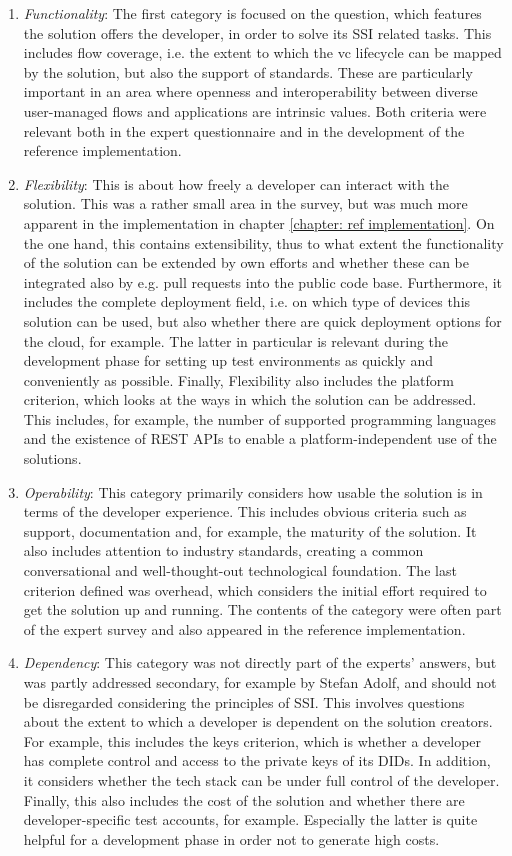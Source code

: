     \begin{enumerate}
        \item \textit{Functionality}: The first category is focused on the question, which features the solution offers the developer, in order to solve its \ac{SSI} related tasks. This includes flow coverage, i.e. the extent to which the \ac{vc} lifecycle can be mapped by the solution, but also the support of standards. These are particularly important in an area where openness and interoperability between diverse user-managed flows and applications are intrinsic values. Both criteria were relevant both in the expert questionnaire and in the development of the reference implementation.
        \item \textit{Flexibility}: This is about how freely a developer can interact with the solution. This was a rather small area in the survey, but was much more apparent in the implementation in chapter \ref{chapter: ref implementation}. On the one hand, this contains extensibility, thus to what extent the functionality of the solution can be extended by own efforts and whether these can be integrated also by e.g. pull requests into the public code base. Furthermore, it includes the complete deployment field, i.e. on which type of devices this solution can be used, but also whether there are quick deployment options for the cloud, for example. The latter in particular is relevant during the development phase for setting up test environments as quickly and conveniently as possible. Finally, Flexibility also includes the platform criterion, which looks at the ways in which the solution can be addressed. This includes, for example, the number of supported programming languages and the existence of REST APIs to enable a platform-independent use of the solutions.
        \item \textit{Operability}: This category primarily considers how usable the solution is in terms of the developer experience. This includes obvious criteria such as support, documentation and, for example, the maturity of the solution. It also includes attention to industry standards, creating a common conversational and well-thought-out technological foundation. The last criterion defined was overhead, which considers the initial effort required to get the solution up and running. The contents of the category were often part of the expert survey and also appeared in the reference implementation.
        \item \textit{Dependency}: This category was not directly part of the experts' answers, but was partly addressed secondary, for example by Stefan Adolf, and should not be disregarded considering the principles of \ac{SSI}. This involves questions about the extent to which a developer is dependent on the solution creators. For example, this includes the keys criterion, which is whether a developer has complete control and access to the private keys of its \acp{DID}. In addition, it considers whether the tech stack can be under full control of the developer. Finally, this also includes the cost of the solution and whether there are developer-specific test accounts, for example. Especially the latter is quite helpful for a development phase in order not to generate high costs.

\end{enumerate}
